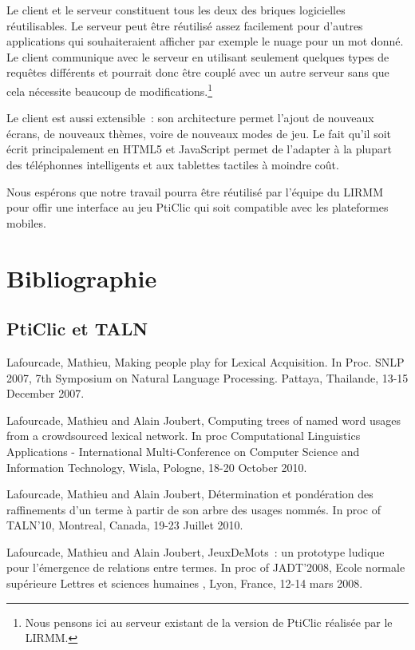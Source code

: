 \documentclass[a4paper,11pt,french]{article}
\begin{document}
Le client et le serveur constituent tous les deux des briques logicielles réutilisables. Le serveur peut être réutilisé assez facilement
pour d'autres applications qui souhaiteraient afficher par exemple le nuage pour un mot donné. Le client communique avec le serveur en
utilisant seulement quelques types de requêtes différents et pourrait donc être couplé avec un autre serveur sans que cela nécessite beaucoup de modifications.\footnote{Nous pensons ici au serveur existant de la version de PtiClic réalisée par le LIRMM.}

Le client est aussi extensible~: son architecture permet l'ajout de nouveaux écrans, de nouveaux thèmes, voire de nouveaux modes de jeu. Le
fait qu'il soit écrit principalement en HTML5 et JavaScript permet de l'adapter à la plupart des téléphonnes intelligents et aux tablettes tactiles à
moindre coût.

Nous espérons que notre travail pourra être réutilisé par l'équipe du LIRMM pour offir une interface au jeu PtiClic qui soit compatible avec
les plateformes mobiles.

\newpage

\section{Bibliographie}
\subsection{PtiClic et TALN}

Lafourcade, Mathieu, Making people play for Lexical Acquisition. In Proc. SNLP 2007, 7th Symposium on Natural Language Processing. Pattaya, Thailande, 13-15 December 2007.

Lafourcade, Mathieu and Alain Joubert, Computing trees of named word usages from a crowdsourced lexical network. In proc Computational Linguistics Applications - International Multi-Conference on Computer Science and Information Technology, Wisla, Pologne, 18-20 October 2010.

Lafourcade, Mathieu and Alain Joubert, Détermination et pondération des raffinements d'un terme à partir de son arbre des usages nommés. In proc of TALN'10, Montreal, Canada, 19-23 Juillet 2010.

Lafourcade, Mathieu and Alain Joubert, JeuxDeMots~: un prototype ludique pour l’émergence de relations entre termes. In proc of JADT'2008, Ecole normale supérieure Lettres et sciences humaines , Lyon, France, 12-14 mars 2008.
\end{document}

